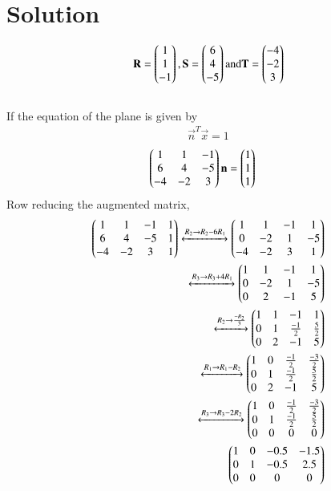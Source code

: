 \documentclass[journal,12pt,twocolumn]{IEEEtran}
\begin{document}
\section{Solution}
\begin{align}
\mathbf{R} = \begin{pmatrix}1\\1\\-1\end{pmatrix},\mathbf{S} = \begin{pmatrix}6\\4\\-5\end{pmatrix} \text{and} \mathbf{T} = \begin{pmatrix}-4\\-2\\3\end{pmatrix}
\end{align}
\\ If the equation of the plane is given by
\begin{align}
\vec{n}^T\vec{x} = 1
\end{align}
\begin{align}
\begin{pmatrix}1&1&-1 \\ 6&4&-5 \\ -4&-2&3\end{pmatrix} \mathbf{n} &= \begin{pmatrix}1\\1\\1\end{pmatrix}
\end{align}
Row reducing the augmented matrix, 
\begin{align}
\begin{pmatrix}1 & 1 & -1 & 1\\6 & 4 & -5 & 1\\-4 & -2 & 3 & 1\end{pmatrix}
\xleftrightarrow {R_2\rightarrow 
R_2-6R_1}\begin{pmatrix}1 & 1 & -1 & 1\\0 & -2 & 1 & -5\\-4 & -2 & 3 & 1\end{pmatrix}
\\
\xleftrightarrow{R_3\rightarrow R_3+4R_1}\begin{pmatrix}1 & 1 & -1 & 1\\0 & -2 & 1 & -5\\0 & 2 & -1 & 5\end{pmatrix}
\\
\xleftrightarrow{R_2\rightarrow\frac{-R_2}{3}}\begin{pmatrix}1 & 1 & -1 & 1\\0 & 1 & \frac{-1}{2} & \frac{5}{2}\\0 & 2 & -1 & 5\end{pmatrix}
\\
\xleftrightarrow{R_1\rightarrow{R_1-R_2}}\begin{pmatrix}1 & 0 & \frac{-1}{2} & \frac{-3}{2}\\0 & 1 & \frac{-1}{2} & \frac{5}{2}\\0 & 2 & -1 & 5\end{pmatrix}
\\
\xleftrightarrow{R_3\rightarrow{R_3-2R_2}}\begin{pmatrix}1 & 0 & \frac{-1}{2} & \frac{-3}{2}\\0 & 1 & \frac{-1}{2} & \frac{5}{2}\\0 & 0 & 0 & 0\end{pmatrix}
\\
\begin{pmatrix}1 & 0 & -0.5 & -1.5\\0 & 1 & -0.5 & 2.5\\0 & 0 & 0 & 0\end{pmatrix}
\end{align}
\end{document}
